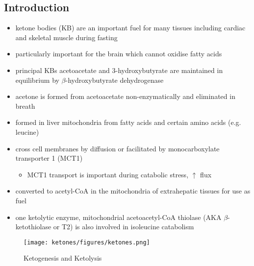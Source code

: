 \documentclass[12pt]{scrartcl}
\begin{document}
\subsection{Introduction}
\label{sec:org9f7f5e9}
\begin{itemize}
\item ketone bodies (KB) are an important fuel for many tissues including
cardiac and skeletal muscle during fasting
\item particularly important for the brain which cannot oxidise fatty
acids
\item principal KBs acetoacetate and 3-hydroxybutyrate are maintained in
equilibrium by \(\beta\)-hydroxybutyrate dehydrogenase

\end{itemize}

\begin{center}
\setatomsep{1.8em}
\hspace{20}
\hspace{20}
\end{center}

\begin{itemize}
\item acetone is formed from acetoacetate non-enzymatically and eliminated in breath
\item formed in liver mitochondria from fatty acids and certain amino acids (e.g. leucine)
\item cross cell membranes by diffusion or facilitated by monocarboxylate transporter 1 (MCT1)
\begin{itemize}
\item MCT1 transport is important during catabolic stress, \(\uparrow\) flux
\end{itemize}
\item converted to acetyl-CoA in the mitochondria of extrahepatic tissues for use as fuel
\item one ketolytic enzyme, mitochondrial acetoacetyl-CoA thiolase (AKA
\(\beta\)-ketothiolase or T2) is also involved in isoleucine catabolism
\end{itemize}

\begin{figure}[htbp]
\centering
\texttt{[image: ketones/figures/ketones.png]}
\caption{\label{fig:orgbd9320b}Ketogenesis and Ketolysis}
\end{figure}
\end{document}
